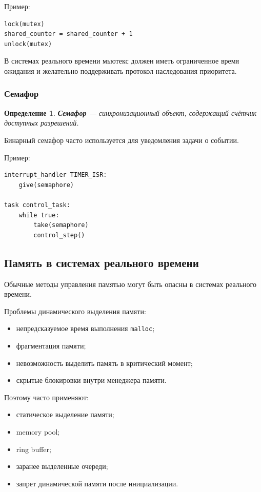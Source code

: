 \documentclass[12pt,a4paper]{article}
\newtheorem{definition}{Определение}
\begin{document}
Пример:
\begin{verbatim}
lock(mutex)
shared_counter = shared_counter + 1
unlock(mutex)
\end{verbatim}

В системах реального времени мьютекс должен иметь ограниченное время ожидания и желательно поддерживать протокол наследования приоритета.

\subsubsection{Семафор}

\begin{definition}
\textbf{Семафор} --- синхронизационный объект, содержащий счётчик доступных разрешений.
\end{definition}

Бинарный семафор часто используется для уведомления задачи о событии.

Пример:
\begin{verbatim}
interrupt_handler TIMER_ISR:
    give(semaphore)

task control_task:
    while true:
        take(semaphore)
        control_step()
\end{verbatim}

\subsection{Память в системах реального времени}

Обычные методы управления памятью могут быть опасны в системах реального времени.

Проблемы динамического выделения памяти:
\begin{itemize}
    \item непредсказуемое время выполнения \texttt{malloc};
    \item фрагментация памяти;
    \item невозможность выделить память в критический момент;
    \item скрытые блокировки внутри менеджера памяти.
\end{itemize}

Поэтому часто применяют:
\begin{itemize}
    \item статическое выделение памяти;
    \item memory pool;
    \item ring buffer;
    \item заранее выделенные очереди;
    \item запрет динамической памяти после инициализации.
\end{itemize}
\end{document}
